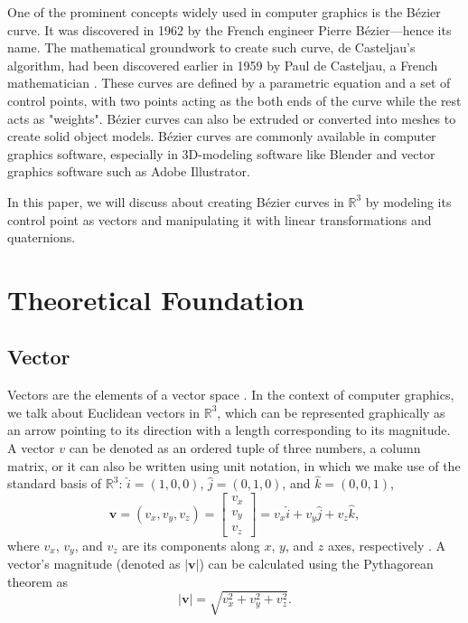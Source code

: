 \documentclass[conference]{IEEEtran}
\begin{document}
One of the prominent concepts widely used in computer graphics is the Bézier curve. It was discovered in 1962 by the French engineer Pierre Bézier---hence its name. The mathematical groundwork to create such curve, de Casteljau's algorithm, had been discovered earlier in 1959 by Paul de Casteljau, a French mathematician \cite{bezier}. These curves are defined by a parametric equation and a set of control points, with two points acting as the both ends of the curve while the rest acts as "weights". Bézier curves can also be extruded or converted into meshes to create solid object models. Bézier curves are commonly available in computer graphics software, especially in 3D-modeling software like Blender and vector graphics software such as Adobe Illustrator. 

In this paper, we will discuss about creating Bézier curves in $\mathbb{R}^3$ by modeling its control point as vectors and manipulating it with linear transformations and quaternions. 

\section{Theoretical Foundation}
\subsection{Vector} 
Vectors are the elements of a vector space \cite{strang}. In the context of computer graphics, we talk about Euclidean vectors in $\mathbb{R}^3$, which can be represented graphically as an arrow pointing to its direction with a length corresponding to its magnitude. A vector $v$ can be denoted as an ordered tuple of three numbers, a column matrix, or it can also be written using unit notation, in which we make use of the standard basis of $\mathbb{R}^3$: $\hat{i} = (1, 0, 0)$, $\hat{j} = (0, 1, 0)$, and $\hat{k} = (0, 0, 1)$,
\begin{equation}
    \mathbf{v} = (v_x, v_y, v_z) = \begin{bmatrix}v_x \\ v_y \\ v_z \end{bmatrix} = v_x \hat{i} + v_y \hat{j} + v_z \hat{k},
\end{equation}
where $v_x$, $v_y$, and $v_z$ are its components along $x$, $y$, and $z$ axes, respectively \cite{lengyel}. A vector's magnitude (denoted as $|\mathbf{v}|$) can be calculated using the Pythagorean theorem as
\begin{equation}
    |\mathbf{v}| = \sqrt{v_x^2 + v_y^2 + v_z^2}. 
\end{equation}
\end{document}
